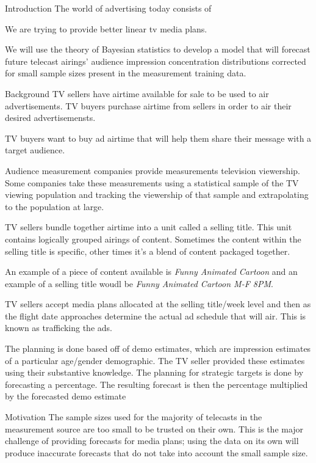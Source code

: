 \begin{chapter}{Introduction}\label{introduction}
  The world of advertising today consists of

  We are trying to provide better linear tv media plans.

  We will use the theory of Bayesian statistics to develop a model that
  will forecast future telecast airings' audience impression concentration
  distributions corrected for small sample sizes present in the measurement
  training data.

\begin{section}{Background}
  TV sellers have airtime available for sale to be used to air advertisements.
  TV buyers purchase airtime from sellers in order to air their desired advertisemensts.

  TV buyers want to buy ad airtime that will help them share their message
  with a target audience.

  Audience measurement companies provide measurements television viewership.
  Some companies take these measurements using a statistical sample of the
  TV viewing population and tracking the viewership of that sample and extrapolating
  to the population at large.

  TV sellers bundle together airtime into a unit called a selling title.
  This unit contains logically grouped airings of content. Sometimes the content
  within the selling title is specific, other times it's a blend of content packaged together.

  An example of a piece of content available is \textit{Funny Animated Cartoon}
  and an example of a selling title woudl be \textit{Funny Animated Cartoon M-F 8PM}.

  TV sellers accept media plans allocated at the selling title/week level and then
  as the flight date approaches determine the actual ad schedule that will air.
  This is known as trafficking the ads.

  The planning is done based off of demo estimates, which are impression estimates of
  a particular age/gender demographic. The TV seller provided these estimates
  using their substantive knowledge. The planning for strategic targets is
  done by forecasting a percentage. The resulting forecast is then the percentage multiplied by the forecasted
  demo estimate
\end{section}

\begin{section}{Motivation}
  The sample sizes used for the majority of telecasts in the measurement source
  are too small to be trusted on their own. This is the major challenge of providing
  forecasts for media plans; using the data on its own will produce inaccurate
  forecasts that do not take into account the small sample size.


\end{section}
\end{chapter}
